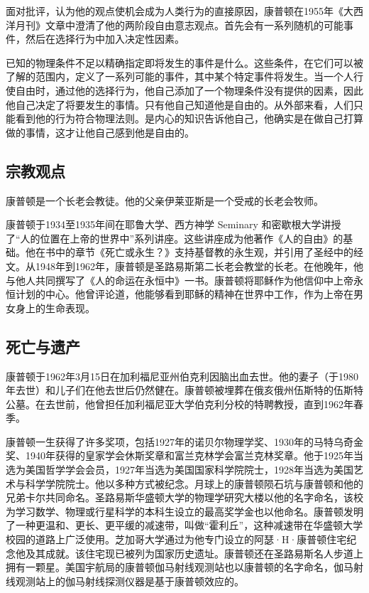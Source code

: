 面对批评，认为他的观点使机会成为人类行为的直接原因，康普顿在1955年《大西洋月刊》文章中澄清了他的两阶段自由意志观点。首先会有一系列随机的可能事件，然后在选择行为中加入决定性因素。

已知的物理条件不足以精确指定即将发生的事件是什么。这些条件，在它们可以被了解的范围内，定义了一系列可能的事件，其中某个特定事件将发生。当一个人行使自由时，通过他的选择行为，他自己添加了一个物理条件没有提供的因素，因此他自己决定了将要发生的事情。只有他自己知道他是自由的。从外部来看，人们只能看到他的行为符合物理法则。是内心的知识告诉他自己，他确实是在做自己打算做的事情，这才让他自己感到他是自由的。
\subsection{宗教观点}
康普顿是一个长老会教徒。他的父亲伊莱亚斯是一个受戒的长老会牧师。

康普顿于1934至1935年间在耶鲁大学、西方神学 Seminary 和密歇根大学讲授了“人的位置在上帝的世界中”系列讲座。这些讲座成为他著作《人的自由》的基础。他在书中的章节《死亡或永生？》支持基督教的永生观，并引用了圣经中的经文。从1948年到1962年，康普顿是圣路易斯第二长老会教堂的长老。在他晚年，他与他人共同撰写了《人的命运在永恒中》一书。康普顿将耶稣作为他信仰中上帝永恒计划的中心。他曾评论道，他能够看到耶稣的精神在世界中工作，作为上帝在男女身上的生命表现。
\subsection{死亡与遗产}
康普顿于1962年3月15日在加利福尼亚州伯克利因脑出血去世。他的妻子（于1980年去世）和儿子们在他去世后仍然健在。康普顿被埋葬在俄亥俄州伍斯特的伍斯特公墓。在去世前，他曾担任加利福尼亚大学伯克利分校的特聘教授，直到1962年春季。

康普顿一生获得了许多奖项，包括1927年的诺贝尔物理学奖、1930年的马特乌奇金奖、1940年获得的皇家学会休斯奖章和富兰克林学会富兰克林奖章。他于1925年当选为美国哲学学会会员，1927年当选为美国国家科学院院士，1928年当选为美国艺术与科学学院院士。他以多种方式被纪念。月球上的康普顿陨石坑与康普顿和他的兄弟卡尔共同命名。圣路易斯华盛顿大学的物理学研究大楼以他的名字命名，该校为学习数学、物理或行星科学的本科生设立的最高奖学金也以他命名。康普顿发明了一种更温和、更长、更平缓的减速带，叫做“霍利丘”，这种减速带在华盛顿大学校园的道路上广泛使用。芝加哥大学通过为他专门设立的阿瑟·H·康普顿住宅纪念他及其成就。该住宅现已被列为国家历史遗址。康普顿还在圣路易斯名人步道上拥有一颗星。美国宇航局的康普顿伽马射线观测站也以康普顿的名字命名，伽马射线观测站上的伽马射线探测仪器是基于康普顿效应的。
